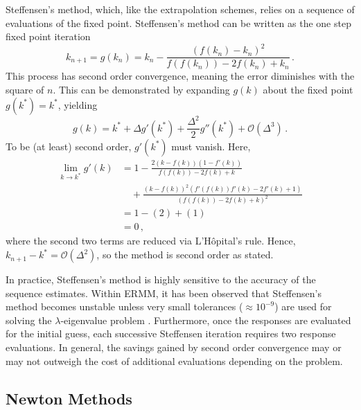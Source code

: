 Steffensen's method, which,
like the extrapolation schemes, relies on a sequence of evaluations 
of the fixed point.
Steffensen's method can be written as the one step fixed point iteration
\begin{equation}
 k_{n+1} = g(k_n) = k_{n} - \frac{(f(k_n) - k_n)^2} 
                     {f(f(k_n)) - 2 f(k_n) + k_n}  \, .
\end{equation}
This process has second order convergence, meaning the error 
diminishes with the square of $n$.  This can be 
demonstrated by expanding $g(k)$ about the fixed point $g(k^*)=k^*$, yielding
\begin{equation}
 g(k) = k^* + \Delta g'(k^*) + \frac{\Delta^2}{2} g''(k^*) 
               + \mathcal{O}(\Delta^3) \, .
\end{equation}
To be (at least) second order, $g'(k^*)$ must vanish.  Here,
\begin{equation}
\begin{split}
  \lim_{k\to k^*}
    g'(k) &= 1 - \frac{2(k-f(k))(1-f'(k))}
                      {f(f(k))-2f(k)+k}\\
          & \quad + \frac{(k-f(k))^2(f'(f(k))f'(k) - 2f'(k)+1)}
                      {(f(f(k))-2f(k)+k)^2} \\
          &= 1 - (2) + (1) \\
          &= 0 \, ,
\end{split}
\end{equation}
where the second two terms are reduced via L'H\^{o}pital's rule.  Hence,
$k_{n+1} - k^* = \mathcal{O}(\Delta^2)$, so the method is second 
order as stated.

In practice, Steffensen's method is highly sensitive to the 
accuracy of the sequence estimates.  Within ERMM, it
has been observed that Steffensen's method becomes unstable
unless very small tolerances ($\approx 10^{-9}$) are used 
for solving the $\lambda$-eigenvalue problem \cite{roberts2012ksi}.
Furthermore,  once the responses are evaluated for the initial
guess, each successive Steffensen iteration requires two response 
evaluations.  In general, the savings gained by second order convergence 
may or may not outweigh the cost of additional evaluations depending 
on the problem.


\subsection{Newton Methods}

